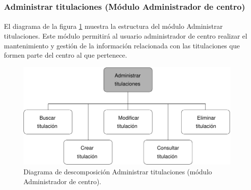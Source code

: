 \subsubsection{Administrar titulaciones (Módulo Administrador de centro)}

  \paragraph{}El diagrama de la figura
  \ref{diagramaDescomposicionAdministrarTitulaciones-admCentro} muestra la
  estructura del módulo Administrar titulaciones. Este módulo permitirá al
  usuario administrador de centro realizar el mantenimiento y gestión de la
  información relacionada con las titulaciones que formen parte del centro al
  que pertenece.

  \begin{figure}[!ht]
    \begin{center}
      \includegraphics[]{11.Disenyo_Arquitectonico/11.2.Diagramas_Descomposicion/11.2.3.Modulo_administrador_centro/AdministrarBBDD/AdministrarTitulaciones/Diagramas/administrar_titulaciones.pdf}
      \caption{Diagrama de descomposición Administrar titulaciones (módulo Administrador de centro).}
      \label{diagramaDescomposicionAdministrarTitulaciones-admCentro}
    \end{center}
  \end{figure}
